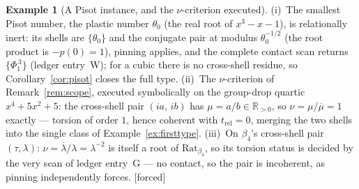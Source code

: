 \documentclass[11pt]{article}
\theoremstyle{plain}
\theoremstyle{definition}
\newtheorem{example}[theorem]{Example}
\theoremstyle{remark}
\newcommand{\R}{\mathbb{R}}
\newcommand{\Rat}{\mathrm{Rat}}
\newcommand{\F}{\textnormal{[forced]}}
\begin{document}
\begin{example}[A Pisot instance, and the $\nu$-criterion executed]
\label{ex:pisotnu}
(i)~The smallest Pisot number, the plastic number $\theta_0$ (the real root
of $x^3-x-1$), is relationally inert: its shells are $\{\theta_0\}$ and the
conjugate pair at modulus $\theta_0^{-1/2}$ (the root product is $-p(0)=1$),
pinning applies, and the complete contact scan returns $\{\Phi_1^{\,3}\}$
(ledger entry~W); for a cubic there is no cross-shell residue, so
Corollary~\ref{cor:pisot} closes the full type. (ii)~The $\nu$-criterion of
Remark~\ref{rem:scope}, executed symbolically on the group-drop quartic
$x^4+5x^2+5$: the cross-shell pair $(ia,\,ib)$ has $\mu=a/b\in\R_{>0}$, so
$\nu=\mu/\overline{\mu}=1$ exactly --- torsion of order $1$, hence coherent
with $t_{\mathrm{rel}}=0$, merging the two shells into the single class of
Example~\ref{ex:firsttype}. (iii)~On $\beta_4$'s cross-shell pair
$(\tau,\lambda)$: $\nu=\overline{\lambda}/\lambda=\lambda^{-2}$ is itself a
root of $\Rat_{\beta_4}$, so its torsion status is decided by the very scan
of ledger entry~G --- no contact, so the pair is incoherent, as pinning
independently forces. \F
\end{example}
\end{document}
